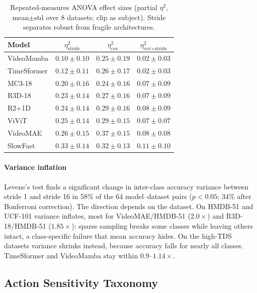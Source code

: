 \documentclass[a4paper, 10pt, conference]{ieeeconf}
\newcommand{\tabtight}{\setlength{\tabcolsep}{3.5pt}\renewcommand{\arraystretch}{1.10}}
\newcommand{\TDS}{\textsc{TDS}}
\begin{document}
\begin{table}[t]
\centering
\caption{Repeated-measures ANOVA effect sizes (partial $\eta^2$, mean$\pm$std over 8 datasets; clip as subject). Stride separates robust from fragile architectures.}
\label{tab:anova}
\scriptsize\tabtight
\begin{tabular}{l ccc}
\toprule
Model & $\eta^2_\text{stride}$ & $\eta^2_\text{cov}$ & $\eta^2_\text{cov$\times$stride}$ \\
\midrule
VideoMamba     & $0.10 \pm 0.10$ & $0.25 \pm 0.19$ & $0.02 \pm 0.03$ \\
TimeSformer    & $0.12 \pm 0.11$ & $0.26 \pm 0.17$ & $0.02 \pm 0.03$ \\
MC3-18         & $0.20 \pm 0.16$ & $0.24 \pm 0.16$ & $0.07 \pm 0.09$ \\
R3D-18         & $0.23 \pm 0.14$ & $0.27 \pm 0.16$ & $0.07 \pm 0.09$ \\
R2+1D          & $0.24 \pm 0.14$ & $0.29 \pm 0.16$ & $0.08 \pm 0.09$ \\
ViViT          & $0.25 \pm 0.14$ & $0.29 \pm 0.15$ & $0.07 \pm 0.07$ \\
VideoMAE       & $0.26 \pm 0.15$ & $0.37 \pm 0.15$ & $0.08 \pm 0.08$ \\
SlowFast       & $0.33 \pm 0.14$ & $0.32 \pm 0.13$ & $0.11 \pm 0.10$ \\
\bottomrule
\end{tabular}
\end{table}

\paragraph{Variance inflation}
Levene's test finds a significant change in inter-class accuracy variance between stride 1 and stride 16 in 58\% of the 64 model--dataset pairs ($p<0.05$; 34\% after Bonferroni correction). The direction depends on the dataset. On HMDB-51 and UCF-101 variance inflates, most for VideoMAE/HMDB-51 ($2.0\times$) and R3D-18/HMDB-51 ($1.85\times$): sparse sampling breaks some classes while leaving others intact, a class-specific failure that mean accuracy hides. On the high-\TDS{} datasets variance shrinks instead, because accuracy falls for nearly all classes. TimeSformer and VideoMamba stay within $0.9$--$1.14\times$.

\subsection{Action Sensitivity Taxonomy}
\label{sec:taxonomy}
\end{document}
